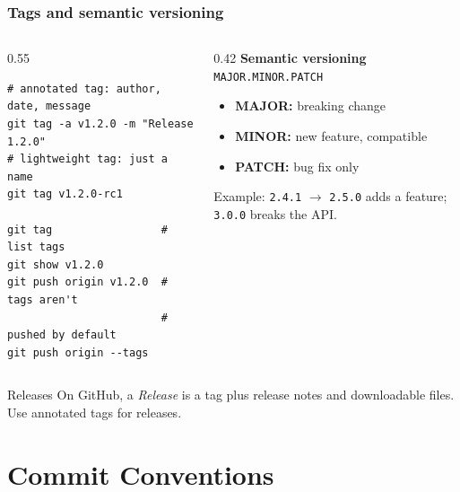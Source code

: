 \documentclass[aspectratio=169,10pt,compress]{beamer}
\begin{document}
\begin{frame}[t,fragile] \frametitle{Tags and semantic versioning}
  \begin{columns}[T]
    \begin{column}{0.55\textwidth}
\begin{lstlisting}
# annotated tag: author, date, message
git tag -a v1.2.0 -m "Release 1.2.0"
# lightweight tag: just a name
git tag v1.2.0-rc1

git tag                 # list tags
git show v1.2.0
git push origin v1.2.0  # tags aren't
                        # pushed by default
git push origin --tags
\end{lstlisting}
    \end{column}
    \begin{column}{0.42\textwidth}
      \textbf{Semantic versioning}\\[2pt]
      \texttt{MAJOR.MINOR.PATCH}
      \begin{itemize}\small
        \item \textbf{MAJOR:} breaking change
        \item \textbf{MINOR:} new feature, compatible
        \item \textbf{PATCH:} bug fix only
      \end{itemize}
      \vspace{0.3em}
      \small Example: \texttt{2.4.1} $\rightarrow$ \texttt{2.5.0} adds a feature;
      \texttt{3.0.0} breaks the API.
    \end{column}
  \end{columns}

  \begin{block}{Releases}
    On GitHub, a \emph{Release} is a tag plus release notes and downloadable files.
    Use annotated tags for releases.
  \end{block}
\end{frame}

\section[Commits]{Commit Conventions}
\end{document}
